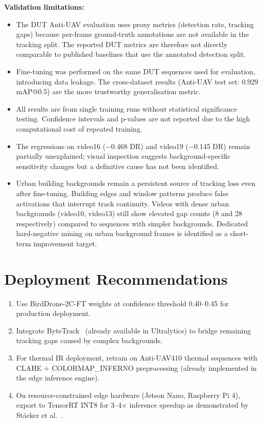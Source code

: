 \documentclass[12pt,a4paper]{report}
\begin{document}
\textbf{Validation limitations:}
\begin{itemize}
  \item The DUT Anti-UAV evaluation uses proxy metrics (detection rate,
        tracking gaps) because per-frame ground-truth annotations are not
        available in the tracking split. The reported DUT metrics are
        therefore not directly comparable to published baselines that use
        the annotated detection split.
  \item Fine-tuning was performed on the same DUT sequences used for
        evaluation, introducing data leakage. The cross-dataset results
        (Anti-UAV test set: 0.929 mAP@0.5) are the more trustworthy
        generalisation metric.
  \item All results are from single training runs without statistical
        significance testing. Confidence intervals and p-values are not
        reported due to the high computational cost of repeated training.
  \item The regressions on video16 ($-$0.468 DR) and video19 ($-$0.145 DR)
        remain partially unexplained; visual inspection suggests
        background-specific sensitivity changes but a definitive cause
        has not been identified.
  \item Urban building backgrounds remain a persistent source of tracking
        loss even after fine-tuning. Building edges and window patterns
        produce false activations that interrupt track continuity. Videos
        with dense urban backgrounds (video10, video13) still show elevated
        gap counts (8 and 28 respectively) compared to sequences with
        simpler backgrounds. Dedicated hard-negative mining on urban
        background frames is identified as a short-term improvement target.
\end{itemize}

\section{Deployment Recommendations}

\begin{enumerate}
  \item Use BirdDrone-2C-FT weights at confidence threshold 0.40--0.45
        for production deployment.
  \item Integrate ByteTrack~\cite{zhang2022bytetrack} (already available
        in Ultralytics) to bridge remaining tracking gaps caused by complex
        backgrounds.
  \item For thermal IR deployment, retrain on Anti-UAV410 thermal sequences
        with CLAHE + COLORMAP\_INFERNO preprocessing (already implemented
        in the edge inference engine).
  \item On resource-constrained edge hardware (Jetson Nano, Raspberry Pi 4),
        export to TensorRT INT8 for 3--4$\times$ inference speedup as
        demonstrated by Stäcker et al.~\cite{stacker2021}.
\end{enumerate}
\end{document}
